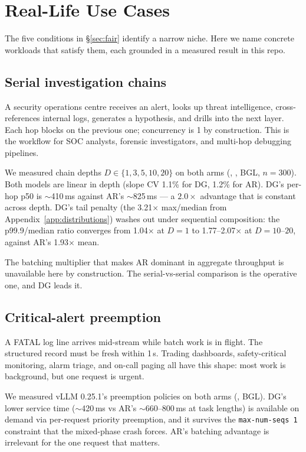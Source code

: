 \section{Real-Life Use Cases}
\label{sec:usecases}

The five conditions in \S\ref{sec:fair} identify a narrow niche. Here we
name concrete workloads that satisfy them, each grounded in a measured
result in this repo.

\subsection{Serial investigation chains}

A security operations centre receives an alert, looks up threat
intelligence, cross-references internal logs, generates a hypothesis, and
drills into the next layer. Each hop blocks on the previous one;
concurrency is 1 by construction. This is the workflow for SOC analysts,
forensic investigators, and multi-hop debugging pipelines.

We measured chain depths $D \in \{1,3,5,10,20\}$ on both arms
(,
, BGL, $n{=}300$). Both models are
linear in depth (slope CV 1.1\% for DG, 1.2\% for AR). DG's per-hop p50 is
$\sim$410\,ms against AR's $\sim$825\,ms --- a $2.0\times$ advantage that is
constant across depth. DG's tail penalty (the 3.21$\times$ max/median from
Appendix~\ref{app:distributions}) washes out under sequential composition:
the p99.9/median ratio converges from 1.04$\times$ at $D{=}1$ to
1.77--2.07$\times$ at $D{=}10$--$20$, against AR's 1.93$\times$ mean.

The batching multiplier that makes AR dominant in aggregate throughput is
unavailable here by construction. The serial-vs-serial comparison is the
operative one, and DG leads it.

\subsection{Critical-alert preemption}

A FATAL log line arrives mid-stream while batch work is in flight. The
structured record must be fresh within 1\,s. Trading dashboards,
safety-critical monitoring, alarm triage, and on-call paging all have this
shape: most work is background, but one request is urgent.

We measured vLLM 0.25.1's preemption policies on both arms
(, BGL). DG's lower service time
($\sim$420\,ms vs AR's $\sim$660--800\,ms at task lengths) is available on
demand via per-request priority preemption, and it survives the
\texttt{max-num-seqs 1} constraint that the mixed-phase crash forces.
AR's batching advantage is irrelevant for the one request that matters.


